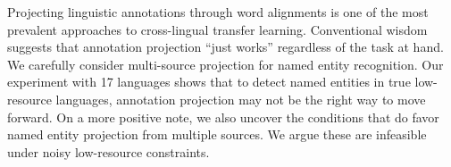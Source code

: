 Projecting linguistic annotations through word alignments is one of the most prevalent approaches to cross-lingual transfer learning. Conventional wisdom suggests that annotation projection ``just works'' regardless of the task at hand. We carefully consider multi-source projection for named entity recognition. Our experiment with 17 languages shows that to detect named entities in true low-resource languages, annotation projection may not be the right way to move forward. On a more positive note, we also uncover the conditions that do favor named entity projection from multiple sources. We argue these are infeasible under noisy low-resource constraints.
